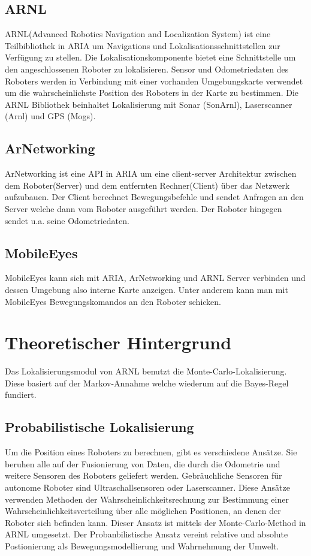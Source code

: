 \documentclass{article}
\begin{document}
\subsection{ARNL}
ARNL(Advanced Robotics Navigation and Localization System) ist eine Teilbibliothek in ARIA um Navigations und Lokalisationsschnittstellen zur Verf\"ugung zu stellen. Die Lokalisationskomponente bietet eine Schnittstelle um den angeschlossenen Roboter zu lokalisieren. Sensor und Odometriedaten des Roboters werden in Verbindung mit einer vorhanden Umgebungskarte verwendet um die wahrscheinlichste Position des Roboters in der Karte zu bestimmen. \cite{arnl} 
Die ARNL Bibliothek beinhaltet Lokalisierung mit Sonar (SonArnl), Laserscanner (Arnl) und GPS (Mogs).

\subsection{ArNetworking}


ArNetworking ist eine API in ARIA um eine client-server Architektur zwischen dem Roboter(Server) und dem entfernten Rechner(Client) \"uber das Netzwerk aufzubauen. Der Client berechnet Bewegungsbefehle und sendet Anfragen an den Server welche dann vom Roboter ausgef\"uhrt werden. Der Roboter hingegen sendet u.a. seine Odometriedaten. 


\subsection{MobileEyes}
MobileEyes kann sich mit ARIA, ArNetworking und ARNL Server verbinden und dessen Umgebung also interne Karte anzeigen.
Unter anderem kann man mit MobileEyes Bewegungskomandos an den Roboter schicken.\cite{whitebrook1}








\section{Theoretischer Hintergrund}
Das Lokalisierungsmodul von ARNL benutzt die Monte-Carlo-Lokalisierung. Diese basiert auf der Markov-Annahme welche wiederum auf die Bayes-Regel fundiert.




\subsection{Probabilistische Lokalisierung}
Um die Position eines Roboters zu berechnen, gibt es verschiedene Ans\"atze. Sie beruhen alle auf der Fusionierung von Daten, die durch die Odometrie und weitere Sensoren des Roboters geliefert werden. Gebr\"auchliche Sensoren f\"ur autonome Roboter sind Ultraschallsensoren oder Laserscanner.
Diese Ans\"atze verwenden Methoden der Wahrscheinlichkeitsrechnung zur Bestimmung einer Wahrscheinlichkeitsverteilung \"uber alle m\"oglichen Positionen, an denen der Roboter sich befinden kann. Dieser Ansatz ist mittels der Monte-Carlo-Method in ARNL umgesetzt.
Der Probanbilistische Ansatz vereint relative und absolute Postionierung als Bewegungsmodellierung und Wahrnehmung der Umwelt.
\end{document}

